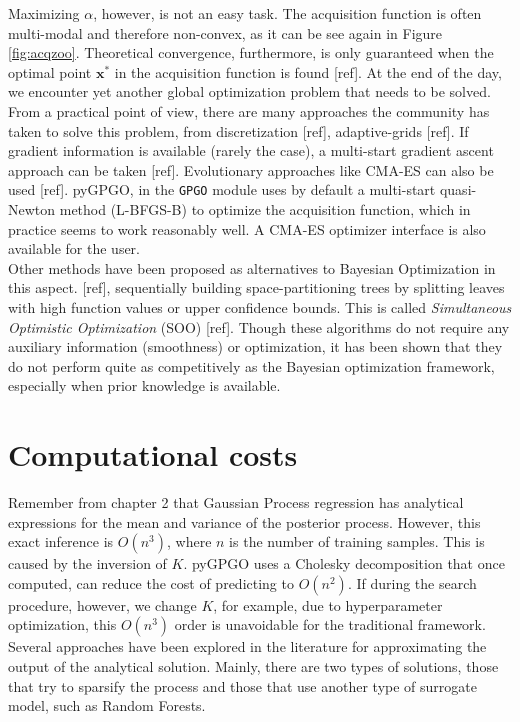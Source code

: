 \documentclass[10pt,a4paper,twoside]{book}
\begin{document}
Maximizing $\alpha$, however, is not an easy task. The acquisition function is often multi-modal and therefore non-convex, as it can be see again in Figure \ref{fig:acqzoo}. Theoretical convergence, furthermore, is only guaranteed when the optimal point $\boldsymbol{x}^*$ in the acquisition function is found [ref]. At the end of the day, we encounter yet another global optimization problem that needs to be solved. From a practical point of view, there are many approaches the community has taken to solve this problem, from discretization [ref], adaptive-grids [ref]. If gradient information is available (rarely the case), a multi-start gradient ascent approach can be taken [ref]. Evolutionary approaches like CMA-ES can also be used [ref]. pyGPGO, in the \texttt{GPGO} module uses by default a multi-start quasi-Newton method (L-BFGS-B) to optimize the acquisition function, which in practice seems to work reasonably well. A CMA-ES optimizer interface is also available for the user.\\

Other methods have been proposed as alternatives to Bayesian Optimization in this aspect. [ref], sequentially building space-partitioning trees by splitting leaves with high function values or upper confidence bounds. This is called \textit{Simultaneous Optimistic Optimization} (SOO) [ref]. Though these algorithms do not require any auxiliary information (smoothness) or optimization, it has been shown that they do not perform quite as competitively as the Bayesian optimization framework, especially when prior knowledge is available. 

\section{Computational costs}

Remember from chapter 2 that Gaussian Process regression has analytical expressions for the mean and variance of the posterior process. However, this exact inference is $O(n^3)$, where $n$ is the number of training samples. This is caused by the inversion of $K$. pyGPGO uses a Cholesky decomposition that once computed, can reduce the cost of predicting to $O(n^2)$. If during the search procedure, however, we change $K$, for example, due to hyperparameter optimization, this $O(n^3)$ order is unavoidable for the traditional framework. Several approaches have been explored in the literature for approximating the output of the analytical solution. Mainly, there are two types of solutions, those that try to sparsify the process and those that use another type of surrogate model, such as Random Forests.\\
\end{document}
